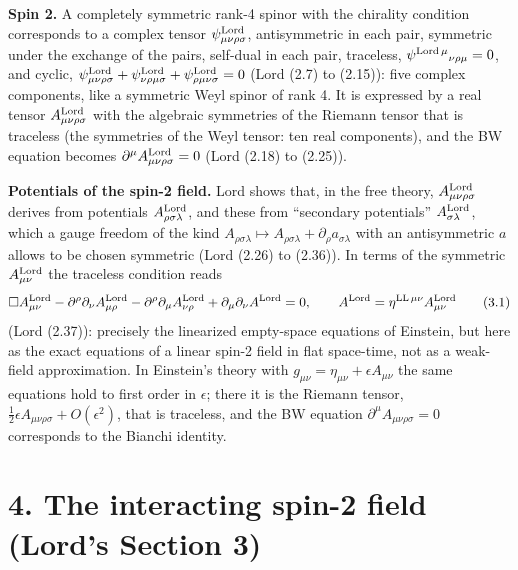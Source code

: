 \documentclass[
  10pt,
]{article}
\begin{document}
\textbf{Spin 2.} A completely symmetric rank-4 spinor with the chirality
condition corresponds to a complex tensor
\(\psi^{\rm Lord}_{\mu\nu\rho\sigma}\), antisymmetric in each pair,
symmetric under the exchange of the pairs, self-dual in each pair,
traceless, \(\psi^{{\rm Lord}\,\mu}{}_{\nu\rho\mu}=0\), and cyclic,
\(\psi^{\rm Lord}_{\mu\nu\rho\sigma}+\psi^{\rm Lord}_{\nu\rho\mu\sigma}+\psi^{\rm Lord}_{\rho\mu\nu\sigma}=0\)
(Lord (2.7) to (2.15)): five complex components, like a symmetric Weyl
spinor of rank 4. It is expressed by a real tensor
\(A^{\rm Lord}_{\mu\nu\rho\sigma}\) with the algebraic symmetries of the
Riemann tensor that is traceless (the symmetries of the Weyl tensor: ten
real components), and the BW equation becomes
\(\partial^\mu A^{\rm Lord}_{\mu\nu\rho\sigma}=0\) (Lord (2.18) to
(2.25)).

\textbf{Potentials of the spin-2 field.} Lord shows that, in the free
theory, \(A^{\rm Lord}_{\mu\nu\rho\sigma}\) derives from potentials
\(A^{\rm Lord}_{\rho\sigma\lambda}\), and these from ``secondary
potentials'' \(A^{\rm Lord}_{\sigma\lambda}\), which a gauge freedom of
the kind
\(A_{\rho\sigma\lambda}\mapsto A_{\rho\sigma\lambda}+\partial_\rho a_{\sigma\lambda}\)
with an antisymmetric \(a\) allows to be chosen symmetric (Lord (2.26)
to (2.36)). In terms of the symmetric \(A^{\rm Lord}_{\mu\nu}\) the
traceless condition reads
\[\Box A^{\rm Lord}_{\mu\nu}-\partial^\rho\partial_\nu A^{\rm Lord}_{\mu\rho}-\partial^\rho\partial_\mu A^{\rm Lord}_{\nu\rho}+\partial_\mu\partial_\nu A^{\rm Lord}=0,\qquad A^{\rm Lord}=\eta^{{\rm LL}\,\mu\nu}A^{\rm Lord}_{\mu\nu}\tag{3.1}\]
(Lord (2.37)): precisely the linearized empty-space equations of
Einstein, but here as the exact equations of a linear spin-2 field in
flat space-time, not as a weak-field approximation. In Einstein's theory
with \(g_{\mu\nu}=\eta_{\mu\nu}+\epsilon A_{\mu\nu}\) the same equations
hold to first order in \(\epsilon\); there it is the Riemann tensor,
\(\tfrac12\epsilon A_{\mu\nu\rho\sigma}+O(\epsilon^2)\), that is
traceless, and the BW equation \(\partial^\mu A_{\mu\nu\rho\sigma}=0\)
corresponds to the Bianchi identity.

\hypertarget{the-interacting-spin-2-field-lords-section-3}{%
\section{4. The interacting spin-2 field (Lord's Section
3)}\label{the-interacting-spin-2-field-lords-section-3}}
\end{document}
